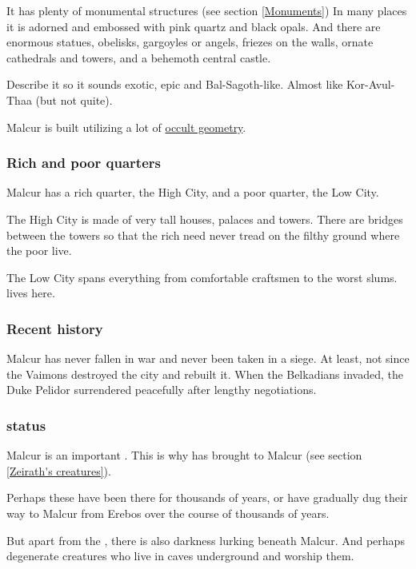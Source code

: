 It has plenty of monumental structures (see section \ref{Monuments})
In many places it is adorned and embossed with pink quartz and black opals. And there are enormous statues, obelisks, gargoyles or angels, friezes on the walls, ornate cathedrals and towers, and a behemoth central castle.

Describe it so it sounds exotic, epic and Bal-Sagoth-like. Almost like Kor-Avul-Thaa (but not quite).

Malcur is built utilizing a lot of \hyperref[Occult geometry]{occult geometry}. 





\subsubsection{Rich and poor quarters}
\label{Malcur rich and poor}
Malcur has a rich quarter, the High City, and a poor quarter, the Low City. 

The High City is made of very tall houses, palaces and towers. There are bridges between the towers so that the rich need never tread on the filthy ground where the poor live. 

The Low City spans everything from comfortable craftsmen to the worst slums.  lives here.





\subsubsection{Recent history}
Malcur has never fallen in war and never been taken in a siege. At least, not since the Vaimons destroyed the city and rebuilt it. When the Belkadians invaded, the Duke Pelidor surrendered peacefully after lengthy negotiations. 





\subsubsection{\Nexus{} status}
Malcur is an important \nexus{}. This is why \Zeirath{} has brought \ghobaleth{} to Malcur (see section \ref{Zeirath's creatures}). 

Perhaps these \ghobaleth{} have been there for thousands of years, or have gradually dug their way to Malcur from Erebos over the course of thousands of years. 

But apart from the \ghobaleth, there is also \xzaishannic{} darkness lurking beneath Malcur. And perhaps degenerate creatures who live in caves underground and worship them. 

